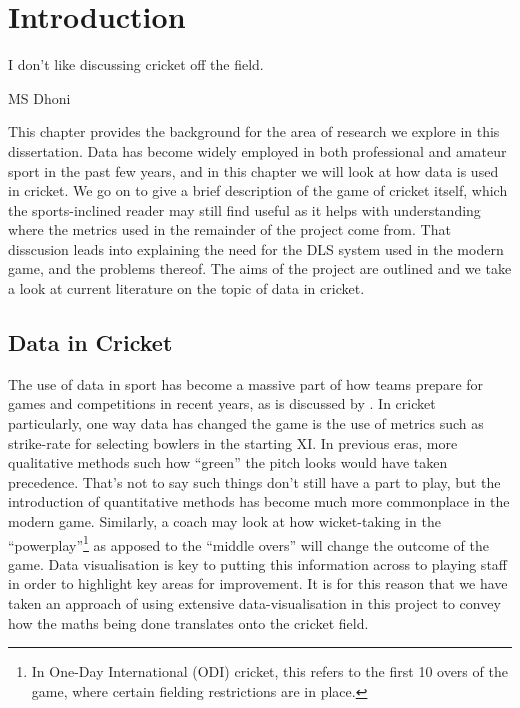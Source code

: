 \chapter{Introduction}

\epigraph{I don't like discussing cricket off the field.}{MS Dhoni}

This chapter provides the background for the area of research we explore in this dissertation. Data has become widely employed in both professional and amateur sport in the past few years, and 
in this chapter we will look at how data is used in cricket. We go on to give a brief description of the game of cricket itself, which the sports-inclined reader may 
still find useful as it helps with understanding where the metrics used in the remainder of the project come from. That disscusion leads into explaining the need for 
the DLS system used in the modern game, and the problems thereof. The aims of the project are outlined and we take a look at current literature on the topic of data in cricket. 

\section{Data in Cricket}
The use of data in sport has become a massive part of how teams prepare for games and competitions in recent years, as is discussed by \cite{spdata}. In cricket particularly, one way data has changed the game is the use
of metrics such as strike-rate for selecting bowlers in the starting XI. In previous eras, more qualitative methods such how ``green'' the pitch looks would have taken precedence. 
That's not to say such things don't still have a part to play, but the introduction of quantitative methods has become much more commonplace in the modern game.
Similarly, a coach may look at how wicket-taking in the ``powerplay''\footnote{In One-Day International (ODI) cricket, this refers to the first 10 overs of the game, where certain fielding restrictions are in place.}
as apposed to the ``middle overs'' will change the outcome of the game. Data visualisation is key to putting this information across to playing staff in order to highlight key areas for
improvement. It is for this reason that we have taken an approach of using extensive data-visualisation in this project to convey how the maths being done translates onto the cricket field. \\ 

